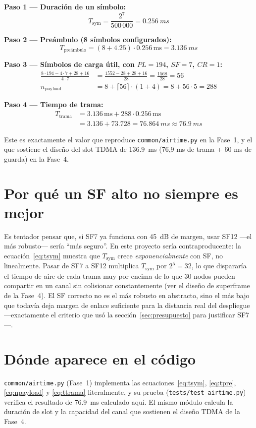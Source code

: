 \begin{ejemplo}
\textbf{Paso 1 — Duración de un símbolo:}
\[
  T_{\text{sym}} = \frac{2^7}{500\,000} = \SI{0.256}{ms}
\]

\textbf{Paso 2 — Preámbulo (8 símbolos configurados):}
\[
  T_{\text{preámbulo}} = (8 + 4.25) \cdot 0.256\,\text{ms} = \SI{3.136}{ms}
\]

\textbf{Paso 3 — Símbolos de carga útil, con $PL = 194$, $SF = 7$, $CR = 1$:}
\begin{align*}
  \frac{8 \cdot 194 - 4 \cdot 7 + 28 + 16}{4 \cdot 7}
    &= \frac{1552 - 28 + 28 + 16}{28} = \frac{1568}{28} = 56 \\
  n_{\text{payload}} &= 8 + \lceil 56 \rceil \cdot (1 + 4) = 8 + 56 \cdot 5 = 288
\end{align*}

\textbf{Paso 4 — Tiempo de trama:}
\begin{align*}
  T_{\text{trama}} &= 3.136\,\text{ms} + 288 \cdot 0.256\,\text{ms} \\
    &= 3.136 + 73.728 = \SI{76.864}{ms} \approx \SI{76.9}{ms}
\end{align*}
\end{ejemplo}

Este es exactamente el valor que reproduce \texttt{common/airtime.py} en la Fase~1, y el que
sostiene el diseño del slot TDMA de \SI{136.9}{ms} (76,9 ms de trama + 60 ms de guarda) en la
Fase~4.

\section{Por qué un SF alto no siempre es mejor}

Es tentador pensar que, si SF7 ya funciona con \SI{45}{dB} de margen, usar SF12 —el más
robusto— sería ``más seguro''. En este proyecto sería contraproducente: la
ecuación~\eqref{eq:tsym} muestra que $T_{\text{sym}}$ crece \emph{exponencialmente} con SF, no
linealmente. Pasar de SF7 a SF12 multiplica $T_{\text{sym}}$ por $2^5 = 32$, lo que dispararía
el tiempo de aire de cada trama muy por encima de lo que 30 nodos pueden compartir en un canal
sin colisionar constantemente (ver el diseño de superframe de la Fase~4). El SF correcto no es
el más robusto en abstracto, sino el más bajo que todavía deja margen de enlace suficiente para
la distancia real del despliegue —exactamente el criterio que usó la sección~\ref{sec:presupuesto}
para justificar SF7—.

\section{Dónde aparece en el código}

\texttt{common/airtime.py} (Fase~1) implementa las ecuaciones~\eqref{eq:tsym},
\eqref{eq:tpre}, \eqref{eq:npayload} y \eqref{eq:ttrama} literalmente, y su prueba
(\texttt{tests/test\_airtime.py}) verifica el resultado de \SI{76.9}{ms} calculado aquí. El
mismo módulo calcula la duración de slot y la capacidad del canal que sostienen el diseño
TDMA de la Fase~4.
